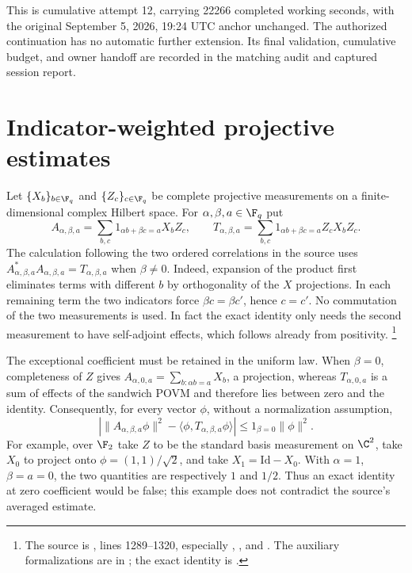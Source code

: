 \documentclass[11pt]{article}
\newcommand{\Id}{\mathrm{Id}}
\begin{document}
This is cumulative attempt 12, carrying 22266 completed working seconds,
with the original September 5, 2026, 19:24 UTC anchor unchanged. The
authorized continuation has no automatic further extension. Its final
validation, cumulative budget, and owner handoff are recorded in the
matching audit and captured session report.

\section{Indicator-weighted projective estimates}

Let $\{X_b\}_{b\in\F_q}$ and $\{Z_c\}_{c\in\F_q}$ be complete
projective measurements on a finite-dimensional complex Hilbert space.
For $\alpha,\beta,a\in\F_q$ put
\[
 A_{\alpha,\beta,a}=\sum_{b,c}
  1_{\alpha b+\beta c=a}X_bZ_c,
 \qquad
 T_{\alpha,\beta,a}=\sum_{b,c}
  1_{\alpha b+\beta c=a}Z_cX_bZ_c.
\]
The calculation following the two ordered correlations in the source uses
$A_{\alpha,\beta,a}^*A_{\alpha,\beta,a}=T_{\alpha,\beta,a}$ when
$\beta\ne0$. Indeed, expansion of the product first eliminates terms
with different $b$ by orthogonality of the $X$ projections. In each
remaining term the two indicators force $\beta c=\beta c'$, hence
$c=c'$. No commutation of the two measurements is used. In fact the
exact identity only needs the second measurement to have self-adjoint
effects, which follows already from positivity.%
\footnote{The source is
,
lines 1289--1320, especially , ,
and . The auxiliary formalizations are in
; the exact
identity is
.}

The exceptional coefficient must be retained in the uniform law. When
$\beta=0$, completeness of $Z$ gives
$A_{\alpha,0,a}=\sum_{b:\alpha b=a}X_b$, a projection, whereas
$T_{\alpha,0,a}$ is a sum of effects of the sandwich POVM and therefore
lies between zero and the identity. Consequently, for every vector $\phi$,
without a normalization assumption,
\[
 \left|\|A_{\alpha,\beta,a}\phi\|^2
       -\langle\phi,T_{\alpha,\beta,a}\phi\rangle\right|
 \leq 1_{\beta=0}\|\phi\|^2.
\]
For example, over $\F_2$ take $Z$ to be the standard basis measurement
on $\C^2$, take $X_0$ to project onto
$\phi=(1,1)/\sqrt2$, and take $X_1=\Id-X_0$. With
$\alpha=1$, $\beta=a=0$, the two quantities are respectively $1$
and $1/2$. Thus an exact identity at zero coefficient would be false;
this example does not contradict the source's averaged estimate.
\end{document}
